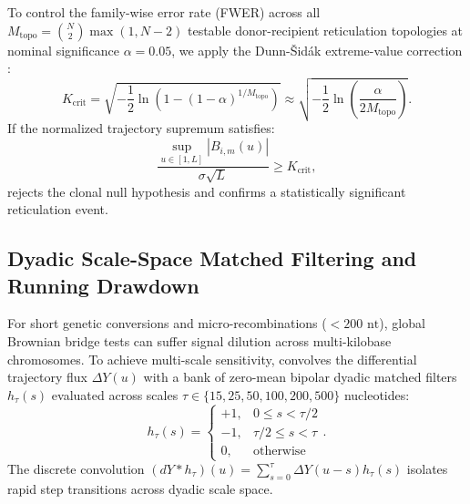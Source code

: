 To control the family-wise error rate (FWER) across all $M_{\text{topo}} = \binom{N}{2} \max(1, N - 2)$ testable donor-recipient reticulation topologies at nominal significance $\alpha = 0.05$, we apply the Dunn-\v{S}id\'{a}k extreme-value correction \citep{sidak1967rectangular}:
\begin{equation}
K_{\text{crit}} = \sqrt{-\frac{1}{2} \ln \left( 1 - (1 - \alpha)^{1 / M_{\text{topo}}} \right)} \approx \sqrt{-\frac{1}{2} \ln \left( \frac{\alpha}{2 M_{\text{topo}}} \right)}.
\label{eq:methods_sidak_bound}
\end{equation}
If the normalized trajectory supremum satisfies:
\begin{equation}
\frac{\sup_{u \in [1, L]} |B_{i, m}(u)|}{\sigma \sqrt{L}} \ge K_{\text{crit}},
\label{eq:methods_rejection_rule}
\end{equation}
\RhizAeon rejects the clonal null hypothesis and confirms a statistically significant reticulation event.

\subsection{Dyadic Scale-Space Matched Filtering and Running Drawdown}
\label{subsec:methods_scalespace_drawdown}

For short genetic conversions and micro-recombinations ($< 200\text{ nt}$), global Brownian bridge tests can suffer signal dilution across multi-kilobase chromosomes.
To achieve multi-scale sensitivity, \RhizAeon convolves the differential trajectory flux $\Delta Y(u)$ with a bank of zero-mean bipolar dyadic matched filters $h_\tau(s)$ evaluated across scales $\tau \in \{15, 25, 50, 100, 200, 500\}$ nucleotides:
\begin{equation}
h_\tau(s) = \begin{cases} +1, & 0 \le s < \tau/2 \\ -1, & \tau/2 \le s < \tau \\ 0, & \text{otherwise} \end{cases}.
\label{eq:methods_wavelet}
\end{equation}
The discrete convolution $(dY * h_\tau)(u) = \sum_{s=0}^\tau \Delta Y(u - s) h_\tau(s)$ isolates rapid step transitions across dyadic scale space.

